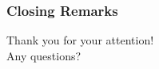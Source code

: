\documentclass{my-Presentation}
\begin{document}
  


\begin{frame}
  \frametitle{Closing Remarks}
  \centering
  {\Large Thank you for your attention!}\\
  \vspace{2em}
  {\large Any questions?}
\end{frame}


\end{document}

